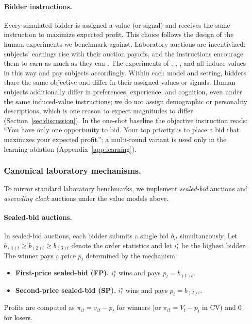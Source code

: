 \documentclass[acmsmall,screen,review]{acmart}
\begin{document}
\paragraph{Bidder instructions.}
Every simulated bidder is assigned a value (or signal) and receives the same instruction to maximize expected profit. This choice follows the design of the human experiments we benchmark against. Laboratory auctions are incentivized: subjects' earnings rise with their auction payoffs, and the instructions encourage them to earn as much as they can \citep{smith1976experimental, smith1982microeconomic}. The experiments of \citet{kagel1993independent}, \citet{li2017obviously}, \citet{breitmoser2022obviousness}, and \citet{gonczarowski2023strategyproofness} all induce values in this way and pay subjects accordingly. Within each model and setting, bidders share the same objective and differ in their assigned values or signals. Human subjects additionally differ in preferences, experience, and cognition, even under the same induced-value instructions; we do not assign demographic or personality descriptions, which is one reason to expect magnitudes to differ (Section~\ref{sec:discussion}). In the one-shot baseline the objective instruction reads: ``You have only one opportunity to bid. Your top priority is to place a bid that maximizes your expected profit.''; a multi-round variant is used only in the learning ablation (Appendix~\ref{app:learning}).

\subsubsection{Canonical laboratory mechanisms.}
To mirror standard laboratory benchmarks, we implement \textit{sealed-bid} auctions and \textit{ascending clock} auctions under the value models above.

\paragraph{Sealed-bid auctions.}
In sealed-bid auctions, each bidder submits a single bid $b_{it}$ simultaneously. Let $b_{(1)t}\ge b_{(2)t}\ge b_{(3)t}$ denote the order statistics and let $i^\star_t$ be the highest bidder. The winner pays a price $p_t$ determined by the mechanism:
\begin{itemize}
    \item \textbf{First-price sealed-bid (FP).} $i^\star_t$ wins and pays $p_t=b_{(1)t}$.
    \item \textbf{Second-price sealed-bid (SP).} $i^\star_t$ wins and pays $p_t=b_{(2)t}$.
\end{itemize}
Profits are computed as $\pi_{it}=v_{it}-p_t$ for winners (or $\pi_{it}=V_t-p_t$ in CV) and $0$ for losers.
\end{document}
